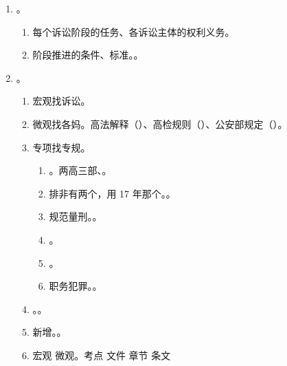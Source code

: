 \begin{enumerate}
        \begin{enumerate}
          \item 答题给出结论和理由要明确直接。。
          \item 用最明确的语言给出的答案。
          \item {}阐述。
          \item 专业术语 \hz 法律规范的规定来直接明确作答，。
        \end{enumerate}
  \item {}。
        \begin{enumerate}
          \item 每个诉讼阶段的任务、各诉讼主体的权利义务。
          \item 阶段推进的条件、标准。。
        \end{enumerate}
  \item {}。
        \begin{enumerate}
          \item 宏观找诉讼。
          \item 微观找各妈。高法解释（）、高检规则（）、公安部规定（）。
          \item 专项找专规。
                \begin{enumerate}
                  \item {}。两高三部、。
                  \item 排非有两个，用 17 年那个。。
                  \item 规范量刑。。
                  \item {}。
                  \item {}。
                  \item 职务犯罪。。
                \end{enumerate}
          \item {}。。
          \item 新增。。
          \item 宏观 \yjt 微观。考点 \yjt 文件 \yjt 章节 \yjt 条文
        \end{enumerate}
\end{enumerate}
